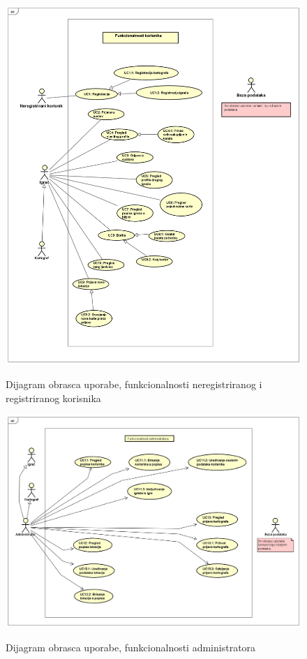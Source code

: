 				\begin{figure}[H]
					\centering
					\includegraphics[scale=0.42]{dijagrami/funkcionalnosti_korisnika} \\
					\caption{Dijagram obrasca uporabe, funkcionalnosti neregistriranog i registriranog korisnika}
					\label{fig:funkcionalnosti_korisnika}
				\end{figure}
			
			\begin{figure}[H]
				\centering
				\includegraphics[scale=0.42]{dijagrami/funkcionalnosti_administratora} \\
				\caption{Dijagram obrasca uporabe, funkcionalnosti administratora}
				\label{fig:funkcionalnosti_administratora} 
			\end{figure}
		
